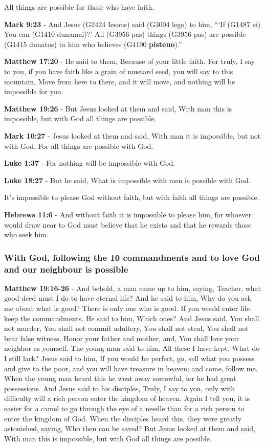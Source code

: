 \documentclass[11pt]{article}
\begin{document}
All things are possible for those who have faith.

\textbf{Mark 9:23} - And Jesus (G2424 Iesous) said (G3004 lego) to him, “‘If (G1487 ei) You can (G1410 dunamai)?’ All (G3956 pas) things (G3956 pas) are possible (G1415 dunatos) to him who believes (G4100 \textbf{pisteuo}).”

\textbf{Matthew 17:20} - He said to them, Because of your little faith. For truly, I say to you, if you have faith like a grain of mustard seed, you will say to this mountain, Move from here to there, and it will move, and nothing will be impossible for you.

\textbf{Matthew 19:26} - But Jesus looked at them and said, With man this is impossible, but with God all things are possible.

\textbf{Mark 10:27} - Jesus looked at them and said, With man it is impossible, but not with God. For all things are possible with God.

\textbf{Luke 1:37} - For nothing will be impossible with God.

\textbf{Luke 18:27} - But he said, What is impossible with men is possible with God.

It's impossible to please God without faith, but with faith all things are possible.

\textbf{Hebrews 11:6} - And without faith it is impossible to please him, for whoever would draw near to God must believe that he exists and that he rewards those who seek him.

\subsubsection{With God, following the 10 commandments and to love God and our neighbour is possible}
\label{sec:org697a765}

\textbf{Matthew 19:16-26} - And behold, a man came up to him, saying, Teacher, what good deed must I do to have eternal life? And he said to him, Why do you ask me about what is good? There is only one who is good. If you would enter life, keep the commandments. He said to him, Which ones? And Jesus said, You shall not murder, You shall not commit adultery, You shall not steal, You shall not bear false witness, Honor your father and mother, and, You shall love your neighbor as yourself. The young man said to him, All these I have kept. What do I still lack? Jesus said to him, If you would be perfect, go, sell what you possess and give to the poor, and you will have treasure in heaven; and come, follow me. When the young man heard this he went away sorrowful, for he had great possessions. And Jesus said to his disciples, Truly, I say to you, only with difficulty will a rich person enter the kingdom of heaven. Again I tell you, it is easier for a camel to go through the eye of a needle than for a rich person to enter the kingdom of God. When the disciples heard this, they were greatly astonished, saying, Who then can be saved? But Jesus looked at them and said, With man this is impossible, but with God all things are possible.
\end{document}
